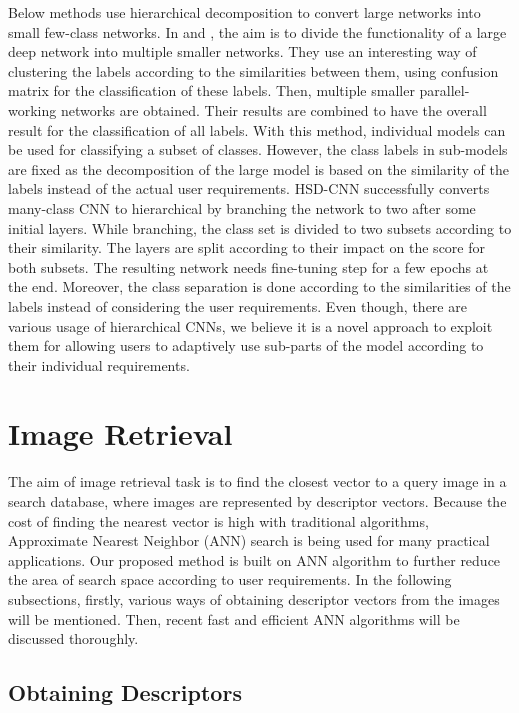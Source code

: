 Below methods use hierarchical decomposition to convert large networks into small few-class networks.
In \cite{chennupati2016hierarchical} and \cite{nooka2016adaptive}, the aim is to divide the functionality of a large deep network into multiple smaller networks. 
They use an interesting way of clustering the labels according to the similarities between them, using confusion matrix for the classification of these labels.
Then, multiple smaller parallel-working networks are obtained. 
Their results are combined to have the overall result for the classification of all labels.
With this method, individual models can be used for classifying a subset of classes.
However, the class labels in sub-models are fixed as the decomposition of the large model is based on the similarity of the labels instead of the actual user requirements.
HSD-CNN\cite{sairam2018hsd} successfully converts many-class CNN to hierarchical by branching the network to two after some initial layers.
While branching, the class set is divided to two subsets according to their similarity.
The layers are split according to their impact on the score for both subsets.
The resulting network needs fine-tuning step for a few epochs at the end. 
Moreover, the class separation is done according to the similarities of the labels instead of considering the user requirements.
Even though, there are various usage of hierarchical CNNs, we believe it is a novel approach to exploit them for allowing users to adaptively use sub-parts of the model according to their individual requirements.


\section{Image Retrieval}

The aim of image retrieval task is to find the closest vector to a query image in a search database, where images are represented by descriptor vectors.
Because the cost of finding the nearest vector is high with traditional algorithms, Approximate Nearest Neighbor (ANN) search is being used for many practical applications.
Our proposed method is built on ANN algorithm to further reduce the area of search space according to user requirements. 
In the following subsections, firstly, various ways of obtaining descriptor vectors from the images will be mentioned. 
Then, recent fast and efficient ANN algorithms will be discussed thoroughly. 

\subsection{Obtaining Descriptors}

